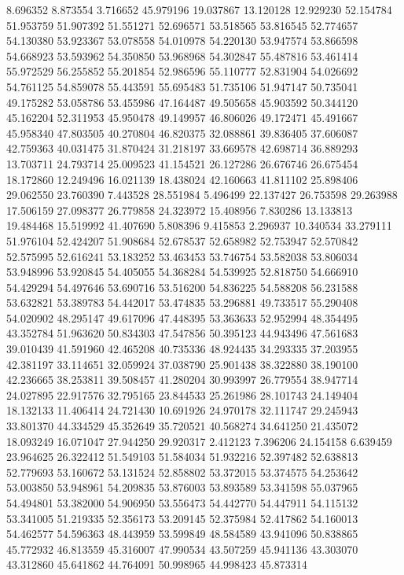 8.696352
8.873554
3.716652
45.979196
19.037867
13.120128
12.929230
52.154784
51.953759
51.907392
51.551271
52.696571
53.518565
53.816545
52.774657
54.130380
53.923367
53.078558
54.010978
54.220130
53.947574
53.866598
54.668923
53.593962
54.350850
53.968968
54.302847
55.487816
53.461414
55.972529
56.255852
55.201854
52.986596
55.110777
52.831904
54.026692
54.761125
54.859078
55.443591
55.695483
51.735106
51.947147
50.735041
49.175282
53.058786
53.455986
47.164487
49.505658
45.903592
50.344120
45.162204
52.311953
45.950478
49.149957
46.806026
49.172471
45.491667
45.958340
47.803505
40.270804
46.820375
32.088861
39.836405
37.606087
42.759363
40.031475
31.870424
31.218197
33.669578
42.698714
36.889293
13.703711
24.793714
25.009523
41.154521
26.127286
26.676746
26.675454
18.172860
12.249496
16.021139
18.438024
42.160663
41.811102
25.898406
29.062550
23.760390
7.443528
28.551984
5.496499
22.137427
26.753598
29.263988
17.506159
27.098377
26.779858
24.323972
15.408956
7.830286
13.133813
19.484468
15.519992
41.407690
5.808396
9.415853
2.296937
10.340534
33.279111
51.976104
52.424207
51.908684
52.678537
52.658982
52.753947
52.570842
52.575995
52.616241
53.183252
53.463453
53.746754
53.582038
53.806034
53.948996
53.920845
54.405055
54.368284
54.539925
52.818750
54.666910
54.429294
54.497646
53.690716
53.516200
54.836225
54.588208
56.231588
53.632821
53.389783
54.442017
53.474835
53.296881
49.733517
55.290408
54.020902
48.295147
49.617096
47.448395
53.363633
52.952994
48.354495
43.352784
51.963620
50.834303
47.547856
50.395123
44.943496
47.561683
39.010439
41.591960
42.465208
40.735336
48.924435
34.293335
37.203955
42.381197
33.114651
32.059924
37.038790
25.901438
38.322880
38.190100
42.236665
38.253811
39.508457
41.280204
30.993997
26.779554
38.947714
24.027895
22.917576
32.795165
23.844533
25.261986
28.101743
24.149404
18.132133
11.406414
24.721430
10.691926
24.970178
32.111747
29.245943
33.801370
44.334529
45.352649
35.720521
40.568274
34.641250
21.435072
18.093249
16.071047
27.944250
29.920317
2.412123
7.396206
24.154158
6.639459
23.964625
26.322412
51.549103
51.584034
51.932216
52.397482
52.638813
52.779693
53.160672
53.131524
52.858802
53.372015
53.374575
54.253642
53.003850
53.948961
54.209835
53.876003
53.893589
53.341598
55.037965
54.494801
53.382000
54.906950
53.556473
54.442770
54.447911
54.115132
53.341005
51.219335
52.356173
53.209145
52.375984
52.417862
54.160013
54.462577
54.596363
48.443959
53.599849
48.584589
43.941096
50.838865
45.772932
46.813559
45.316007
47.990534
43.507259
45.941136
43.303070
43.312860
45.641862
44.764091
50.998965
44.998423
45.873314
